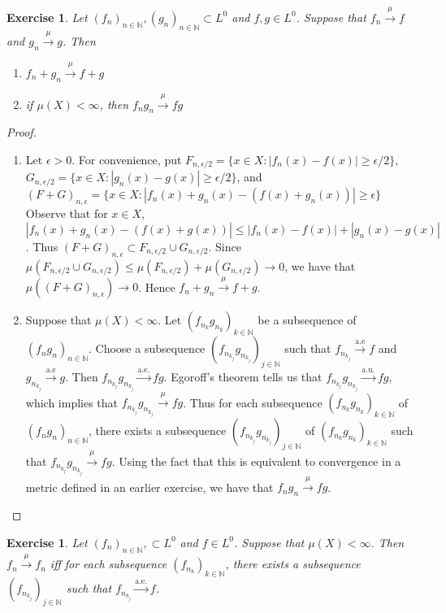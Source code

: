 \documentclass[12pt]{amsart}
\newtheorem{ex}[thm]{Exercise}
\newcommand{\ep}{\epsilon}
\newcommand{\N}{\mathbb{N}}
\newcommand{\convt}[1]{\xrightarrow{\text{#1}}}
\newcommand{\conv}[1]{\xrightarrow{#1}}
\begin{document}
\begin{ex}
	Let $(f_n)_{n \in \N}, (g_n)_{n \in \N} \subset L^0$ and $f,g \in L^0$. Suppose that $f_n \conv{\mu} f$ and $g_n \conv{\mu}g$. Then 
	\begin{enumerate}
		\item $f_n + g_n \conv{\mu} f+g$
		\item if $\mu(X) < \infty$, then $f_n g_n \conv{\mu} fg$
	\end{enumerate}
\end{ex}

\begin{proof}
	
	\begin{enumerate}
		\item Let $\ep > 0$. For convenience, put $F_{n,\ep/2} = \{x \in X: |f_n(x) - f(x)| \geq \ep/2\}$, $G_{n, \ep/2} = \{x \in X: |g_n(x) - g(x)| \geq \ep/2\}$, and $(F+G)_{n,\ep} = \{x \in X: |f_n(x)+g_n(x) - (f(x) + g_n(x))| \geq \ep\}$ Observe that for $x \in X$, $|f_n(x) + g_n(x) - (f(x) + g(x))| \leq |f_n(x) - f(x)| + |g_n(x) - g(x)|$. Thus $(F+G)_{n,\ep} \subset F_{n,\ep/2} \cup G_{n, \ep/2}$. Since $\mu(F_{n,\ep/2} \cup G_{n, \ep/2}) \leq \mu(F_{n,\ep/2}) + \mu(G_{n, \ep/2}) \rightarrow 0$, we have that $\mu((F+G)_{n,\ep}) \rightarrow 0$. Hence $f_n + g_n \conv{\mu} f+g$.
		
		\item Suppose that $\mu(X) < \infty$. Let $(f_{n_k}g_{n_k})_{k \in \N}$ be a subsequence of $(f_ng_n)_{n \in \N}$. Choose a subsequence $(f_{n_{k_j}}g_{n_{k_j}})_{j \in \N}$ such that $f_{n_{k_j}} \convt{a.e} f$ and $g_{n_{k_j}} \convt{a.e} g$. Then $f_{n_{k_j}}g_{n_{k_j}} \convt{a.e.} fg$. Egoroff's theorem tells us that $f_{n_{k_j}}g_{n_{k_j}} \convt{a.u.} fg$, which implies that $f_{n_{k_j}}g_{n_{k_j}} \conv{\mu} fg$. Thus for each subsequence $(f_{n_k}g_{n_k})_{k \in \N}$ of $(f_ng_n)_{n \in \N}$, there exists a subsequence $(f_{n_{k_j}}g_{n_{k_j}})_{j \in \N}$ of $(f_{n_k}g_{n_k})_{k \in \N}$ such that $f_{n_{k_j}}g_{n_{k_j}} \conv{\mu} fg$. Using the fact that this is equivalent to convergence in a metric defined in an earlier exercise,
		we have that $f_ng_n \conv{\mu} fg$.
	\end{enumerate}
	
\end{proof}

\begin{ex}
	Let $(f_n)_{n \in \N}, \subset L^0$ and $f \in L^0$. Suppose that $\mu(X) < \infty$. Then $f_n \conv{\mu}f_n$ iff for each subsequence $(f_{n_k})_{k \in \N}$, there exists a subsequence $(f_{n_{k_j}})_{j \in \N}$ such that $f_{n_{k_j}} \convt{a.e.} f$.
\end{ex}
\end{document}
